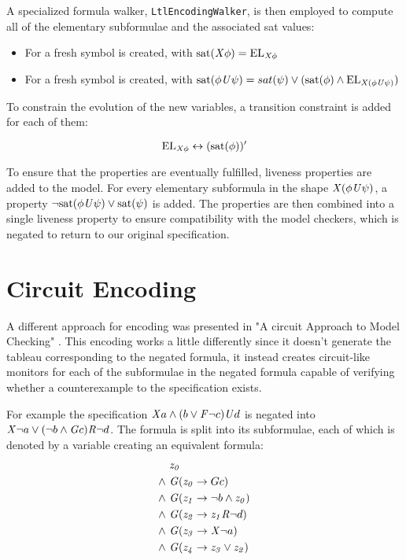 A specialized formula walker, \texttt{LtlEncodingWalker}, is then employed to compute all of the elementary subformulae and the associated sat values:
\begin{itemize}
    \item For \fX{} a fresh symbol \elx{} is created, with $\mathrm{sat}(\mathit{X}{} \phi) = \mathrm{EL}_{\mathit{X}{} \phi}{}$
    \item For \fU{} a fresh symbol \elu{} is created, with $\mathrm{sat}(\phi \mathit{U}{} \psi) = sat(\psi) \lor (\mathrm{sat}(\phi) \land \mathrm{EL}_{\mathit{X} (\phi \mathit{U}{} \psi)})$
\end{itemize}

To constrain the evolution of the new variables, a transition constraint is added for each of them:

\[ \mathrm{EL}_{\mathit{X}{} \phi}{} \leftrightarrow (\mathrm{sat}(\phi))' \]

To ensure that the properties are eventually fulfilled, liveness properties are added to the model.
For every elementary subformula in the shape $\mathit{X} (\phi \mathit{U}{} \psi)$, a property $\lnot \mathrm{sat}(\phi \mathit{U}{} \psi) \lor \mathrm{sat}(\psi)$ is added.
The properties are then combined into a single liveness property to ensure compatibility with the model checkers, which is negated to return to our original \ltl{} specification.


\section{\ltl{} Circuit Encoding}

A different approach for encoding was presented in "A circuit Approach to \ltl{} Model Checking" \cite{DBLP:conf/fmcad/ClaessenES13}.
This encoding works a little differently since it doesn't generate the tableau corresponding to the negated \ltl{} formula, it instead creates circuit-like monitors for each of the subformulae in the negated \ltl{} formula capable of verifying whether a counterexample to the specification exists.

For example the specification $\mathit{X} a \land (b \lor \mathit{F} \lnot c) \mathit{U} d$ is negated into $\mathit{X} \lnot a \lor (\lnot b \land \mathit{G} c) \mathit{R} \lnot d$.
The formula is split into its subformulae, each of which is denoted by a variable creating an equivalent formula:
\begin{align}
           &     \mathit{z_0} \\
    \land\ & \mathit{G} (\mathit{z_0} \rightarrow G c) \\
    \land\ & \mathit{G} (\mathit{z_1} \rightarrow \lnot b \land \mathit{z_0}) \\
    \land\ & \mathit{G} (\mathit{z_2} \rightarrow \mathit{z_1} \mathit{R} \lnot d) \\
    \land\ & \mathit{G} (\mathit{z_3} \rightarrow \mathit{X} \lnot a) \\
    \land\ & \mathit{G} (\mathit{z_4} \rightarrow \mathit{z_3} \lor \mathit{z_2})
\end{align}

